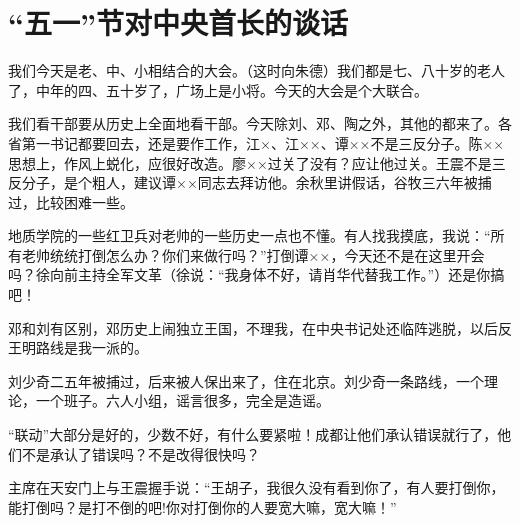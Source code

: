 \section[ “五一”节对中央首长的谈话（一九六七年五月一日）]{ “五一”节对中央首长的谈话}


我们今天是老、中、小相结合的大会。（这时向朱德）我们都是七、八十岁的老人了，中年的四、五十岁了，广场上是小将。今天的大会是个大联合。

我们看干部要从历史上全面地看干部。今天除刘、邓、陶之外，其他的都来了。各省第一书记都要回去，还是要作工作，江×、江××、谭××不是三反分子。陈××思想上，作风上蜕化，应很好改造。廖××过关了没有？应让他过关。王震不是三反分子，是个粗人，建议谭××同志去拜访他。余秋里讲假话，谷牧三六年被捕过，比较困难一些。

地质学院的一些红卫兵对老帅的一些历史一点也不懂。有人找我摸底，我说：“所有老帅统统打倒怎么办？你们来做行吗？”打倒谭××，今天还不是在这里开会吗？徐向前主持全军文革（徐说：“我身体不好，请肖华代替我工作。”）还是你搞吧！

邓和刘有区别，邓历史上闹独立王国，不理我，在中央书记处还临阵逃脱，以后反王明路线是我一派的。

刘少奇二五年被捕过，后来被人保出来了，住在北京。刘少奇一条路线，一个理论，一个班子。六人小组，谣言很多，完全是造谣。

“联动”大部分是好的，少数不好，有什么要紧啦！成都让他们承认错误就行了，他们不是承认了错误吗？不是改得很快吗？

主席在天安门上与王震握手说：“王胡子，我很久没有看到你了，有人要打倒你，能打倒吗？是打不倒的吧!你对打倒你的人要宽大嘛，宽大嘛！”


